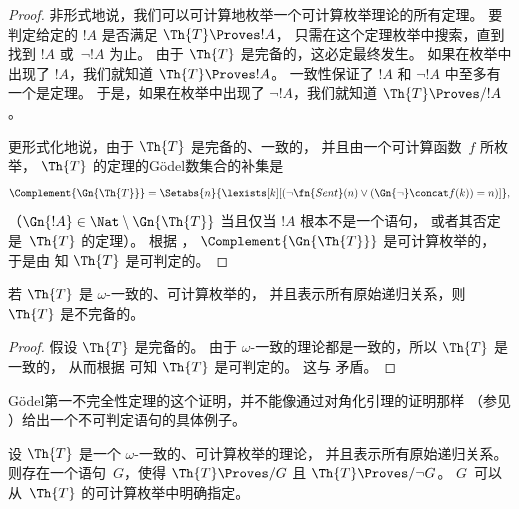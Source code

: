 \documentclass[../OpenLogic/include/open-logic-section]{subfiles}
\begin{document}
\begin{proof}
  非形式地说，我们可以可计算地枚举一个可计算枚举理论的所有定理。
  要判定给定的 $!A$ 是否满足 $\Th{T} \Proves !A$，
  只需在这个定理枚举中搜索，直到找到 $!A$ 或~$\lnot !A$ 为止。
  由于 $\Th{T}$ 是完备的，这必定最终发生。
  如果在枚举中出现了 $!A$，我们就知道 $\Th{T} \Proves !A$。
  一致性保证了 $!A$ 和 $\lnot !A$ 中至多有一个是定理。
  于是，如果在枚举中出现了 $\lnot !A$，我们就知道 $\Th{T} \Proves/ !A$。

  更形式化地说，由于 $\Th{T}$ 是完备的、一致的，
  并且由一个可计算函数~$f$ 所枚举，
  $\Th{T}$ 的定理的Gödel数集合的补集是
  \[\Complement{\Gn{\Th{T}}} = \Setabs{n}{\lexists[k][(\lnot
  \fn{Sent}(n) \lor (\Gn{\lnot} \concat f(k)) = n)]},\]（$\Gn{!A} \in
  \Nat \setminus \Gn{\Th{T}}$ 当且仅当 $!A$ 根本不是一个语句，
  或者其否定是~$\Th{T}$ 的定理）。
  根据 ，
  $\Complement{\Gn{\Th{T}}}$ 是可计算枚举的，
  于是由  知
  $\Th{T}$ 是可判定的。
\end{proof}

\begin{cor}
  若\/ $\Th{T}$ 是 $\omega$-一致的、可计算枚举的，
  并且表示所有原始递归关系，则 $\Th{T}$ 是不完备的。
\end{cor}

\begin{proof}
  假设 $\Th{T}$ 是完备的。
  由于 $\omega$-一致的理论都是一致的，所以 $\Th{T}$ 是一致的，
  从而根据  可知 $\Th{T}$ 是可判定的。
  这与  矛盾。
\end{proof}

Gödel第一不完全性定理的这个证明，并不能像通过对角化引理的证明那样
（参见 ）给出一个不可判定语句的具体例子。

\begin{thm}
  设 $\Th{T}$ 是一个 $\omega$-一致的、可计算枚举的理论，
  并且表示所有原始递归关系。
  则存在一个语句~$G$，使得 $\Th{T} \Proves/ G$ 且 $\Th{T} \Proves/ \lnot G$。
  $G$~可以从~$\Th{T}$ 的可计算枚举中明确指定。
\end{thm}
\end{document}
